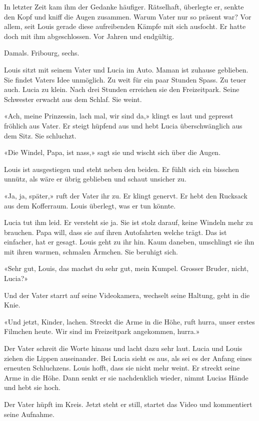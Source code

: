 In letzter Zeit kam ihm der Gedanke häufiger. Rätselhaft, überlegte er,
senkte den Kopf und kniff die Augen zusammen. Warum Vater nur so präsent
war? Vor allem, seit Louis gerade diese aufreibenden Kämpfe mit sich
ausfocht. Er hatte doch mit ihm abgeschlossen. Vor Jahren und endgültig.

Damals. Fribourg, sechs.

Louis sitzt mit seinem Vater und Lucia im Auto. Maman ist zuhause
geblieben. Sie findet Vaters Idee unmöglich. Zu weit für ein paar
Stunden Spass. Zu teuer auch. Lucia zu klein. Nach drei Stunden
erreichen sie den Freizeitpark. Seine Schwester erwacht aus dem Schlaf.
Sie weint.

«Ach, meine Prinzessin, lach mal, wir sind da,» klingt es laut und
gepresst fröhlich aus Vater. Er steigt hüpfend aus und hebt Lucia
überschwänglich aus dem Sitz. Sie schluchzt.

«Die Windel, Papa, ist nass,» sagt sie und wischt sich über die Augen.

Louis ist ausgestiegen und steht neben den beiden. Er fühlt sich ein
bisschen unnütz, als wäre er übrig geblieben und schaut unsicher zu.

«Ja, ja, später,» ruft der Vater ihr zu. Er klingt genervt. Er hebt den
Rucksack aus dem Kofferraum. Louis überlegt, was er tun könnte.

Lucia tut ihm leid. Er versteht sie ja. Sie ist stolz darauf, keine
Windeln mehr zu brauchen. Papa will, dass sie auf ihren Autofahrten
welche trägt. Das ist einfacher, hat er gesagt. Louis geht zu ihr hin.
Kaum daneben, umschlingt sie ihn mit ihren warmen, schmalen Ärmchen. Sie
beruhigt sich.

«Sehr gut, Louis, das machst du sehr gut, mein Kumpel. Grosser Bruder,
nicht, Lucia?»

Und der Vater starrt auf seine Videokamera, wechselt seine Haltung, geht
in die Knie.

«Und jetzt, Kinder, lachen. Streckt die Arme in die Höhe, ruft hurra,
unser erstes Filmchen heute. Wir sind im Freizeitpark angekommen,
hurra.»

Der Vater schreit die Worte hinaus und lacht dazu sehr laut. Lucia und
Louis ziehen die Lippen auseinander. Bei Lucia sieht es aus, als sei es
der Anfang eines erneuten Schluchzens. Louis hofft, dass sie nicht mehr
weint. Er streckt seine Arme in die Höhe. Dann senkt er sie nachdenklich
wieder, nimmt Lucias Hände und hebt sie hoch.

Der Vater hüpft im Kreis. Jetzt steht er still, startet das Video und
kommentiert seine Aufnahme.

